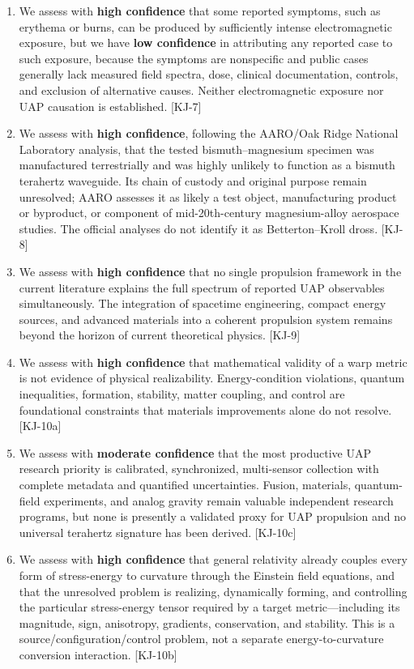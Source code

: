 \documentclass[aps,prd,twocolumn,superscriptaddress,nofootinbib,floatfix]{revtex4-2}
\begin{document}
\begin{enumerate}
    broadband, terahertz, or soft-X-ray emission from a subluminal warp
    configuration. [KJ-6]
  \item We assess with \textbf{high confidence} that some reported symptoms, such
    as erythema or burns, can be produced by sufficiently intense electromagnetic
    exposure, but we have \textbf{low confidence} in attributing any reported case
    to such exposure, because the symptoms are nonspecific and public cases
    generally lack measured field spectra, dose, clinical documentation, controls,
    and exclusion of alternative causes. Neither electromagnetic exposure nor UAP
    causation is established. [KJ-7]
  \item We assess with \textbf{high confidence}, following the AARO/Oak Ridge
    National Laboratory analysis, that the tested bismuth--magnesium specimen was
    manufactured terrestrially and was highly unlikely to function as a bismuth
    terahertz waveguide. Its chain of custody and original purpose remain
    unresolved; AARO assesses it as likely a test object, manufacturing product or
    byproduct, or component of mid-20th-century magnesium-alloy aerospace studies.
    The official analyses do not identify it as Betterton--Kroll dross. [KJ-8]
  \item We assess with \textbf{high confidence} that no single propulsion framework
    in the current literature explains the full spectrum of reported UAP
    observables simultaneously. The integration of spacetime engineering, compact
    energy sources, and advanced materials into a coherent propulsion system
    remains beyond the horizon of current theoretical physics. [KJ-9]
  \item We assess with \textbf{high confidence} that mathematical validity of a
    warp metric is not evidence of physical realizability. Energy-condition
    violations, quantum inequalities, formation, stability, matter coupling, and
    control are foundational constraints that materials improvements alone do not
    resolve. [KJ-10a]
  \item We assess with \textbf{moderate confidence} that the most productive UAP
    research priority is calibrated, synchronized, multi-sensor collection with
    complete metadata and quantified uncertainties. Fusion, materials,
    quantum-field experiments, and analog gravity remain valuable independent
    research programs, but none is presently a validated proxy for UAP propulsion
    and no universal terahertz signature has been derived. [KJ-10c]
  \item We assess with \textbf{high confidence} that general relativity already
    couples every form of stress-energy to curvature through the Einstein field
    equations, and that the unresolved problem is realizing, dynamically forming,
    and controlling the particular stress-energy tensor required by a target
    metric---including its magnitude, sign, anisotropy, gradients, conservation,
    and stability. This is a source/configuration/control problem, not a separate
    energy-to-curvature conversion interaction. [KJ-10b]
\end{enumerate}
\end{document}
